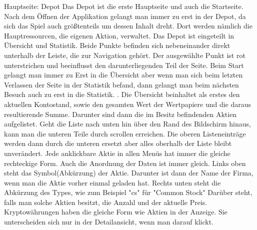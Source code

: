 \documentclass[10pt]{scrartcl}
\begin{document}
Hauptseite: Depot
Das Depot ist die erste Hauptseite und auch die Startseite. Nach dem Öffnen der Applikation gelangt man immer zu erst in der Depot, da sich das Spiel auch größtenteils um dessen Inhalt dreht. Dort werden nämlich die Hauptressourcen, die eigenen Aktion, verwaltet.
Das Depot ist eingeteilt in Übersicht und Statistik. Beide Punkte befinden sich nebeneinander direkt unterhalb der Leiste, die zur Navigation gehört. Der ausgewählte Punkt ist rot unterstrichen und beeinflusst den darunterliegenden Teil der Seite. Beim Start gelangt man immer zu Erst in die Übersicht aber wenn man sich beim letzten Verlassen der Seite in der Statistik befand, dann gelangt man beim nächsten Besuch auch zu erst in die Statistik. .
Die Übersicht beinhaltet als erstes den aktuellen Kontostand, sowie den gesamten Wert der Wertpapiere und die daraus resultierende Summe. Darunter sind dann die im Besitz befindenden Aktien aufgelistet. Geht die Liste nach unten hin über den Rand des Bildschirm hinaus, kann man die unteren Teile durch scrollen erreichen. Die oberen Listeneinträge werden dann durch die unteren ersetzt aber alles oberhalb der Liste bleibt unverändert.
Jede anklickbare Aktie in allen Menüs hat immer die gleiche rechteckige Form. Auch die Anordnung der Daten ist immer gleich. Links oben steht das Symbol(Abkürzung) der Aktie. Darunter ist dann der Name der Firma, wenn man die Aktie vorher einmal geladen hat. Rechts unten steht die Abkürzung des Types, wie zum Beispiel "cs" für "Common Stock" Darüber steht, falls man solche Aktien besitzt, die Anzahl und der aktuelle Preis.
Kryptowährungen haben die gleiche Form wie Aktien in der Anzeige. Sie unterscheiden sich nur in der Detailansicht, wenn man darauf klickt.

	


\end{document}
